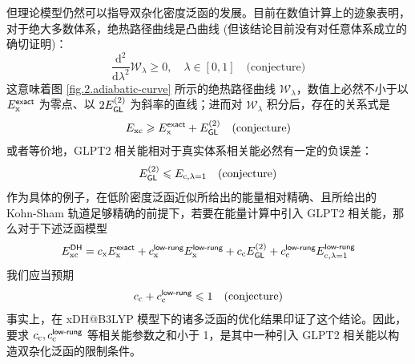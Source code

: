 但理论模型仍然可以指导双杂化密度泛函的发展。目前在数值计算上的迹象表明，对于绝大多数体系，绝热路径曲线是凸曲线\cite{Frydel-Burke.JCP.2000, Fuchs-Burke.JCP.2005, Teale-Helgaker.JCP.2009,Teale-Helgaker.JCP.2010, Carrascal-Burke.JPCM.2015} (但该结论目前没有对任意体系成立的确切证明\cite{Crisostomo-Burke.LMP.2023})：
\begin{equation}
  \frac{\mathrm{d}^2}{\mathrm{d} \lambda^2} \mathcal{W}_{\lambda} \geqslant 0, \quad \lambda \in [0, 1] \quad \text{(conjecture)}
\end{equation}
这意味着图 \ref{fig.2.adiabatic-curve} 所示的绝热路径曲线 $\mathcal{W}_\lambda$，数值上必然不小于以 $E_\mathrm{x}^{\textsf{exact}}$ 为零点、以 $2 E_{\textsf{GL}}^{(2)}$ 为斜率的直线；进而对 $\mathcal{W}_\lambda$ 积分后，存在的关系式是
\begin{equation}
  E_\mathrm{xc} \geqslant E_\mathrm{x}^{\textsf{exact}} + E_{\textsf{GL}}^{(2)} \quad \text{(conjecture)}
\end{equation}
或者等价地，GLPT2 相关能相对于真实体系相关能必然有一定的负误差：
\begin{equation}
  E_{\textsf{GL}}^{(2)} \leqslant E_{\mathrm{c}, \lambda=1} \quad \text{(conjecture)}
\end{equation}
作为具体的例子，在低阶密度泛函近似所给出的能量相对精确、且所给出的 Kohn-Sham 轨道足够精确的前提下，若要在能量计算中引入 GLPT2 相关能，那么对于下述泛函模型
\begin{equation*}
  E_\mathrm{xc}^{\textsf{DH}} = c_\mathrm{x} E_\mathrm{x}^{\textsf{exact}} + c_\mathrm{x}^{\textsf{low-rung}} E_\mathrm{x}^{\textsf{low-rung}} + c_\mathrm{c} E_{\textsf{GL}}^{(2)} + c_\mathrm{c}^{\textsf{low-rung}} E_{\mathrm{c}, \lambda=1}^{\textsf{low-rung}}
\end{equation*}
我们应当预期
\begin{equation*}
  c_\mathrm{c} + c_\mathrm{c}^{\textsf{low-rung}} \leqslant 1 \quad \text{(conjecture)}
\end{equation*}
事实上，在 xDH@B3LYP 模型下的诸多泛函的优化结果印证了这个结论\cite{Zhang-Xu.JPCL.2021}。因此，要求 $c_\mathrm{c}, c_\mathrm{c}^{\textsf{low-rung}}$ 等相关能参数之和小于 1，是其中一种引入 GLPT2 相关能以构造双杂化泛函的限制条件。

